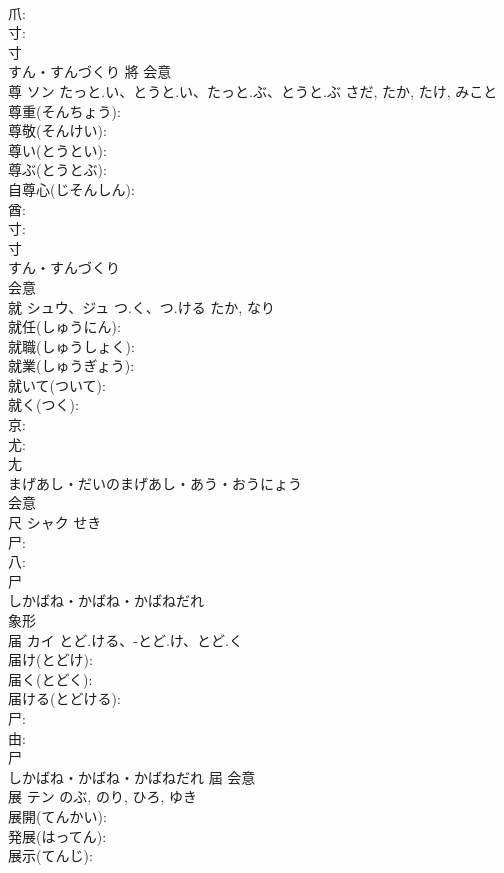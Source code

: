 \documentclass[8pt]{extreport}
\begin{document}
\begin{CJK}{UTF8}{min}
\\	爪: 
\\	寸: 
\\	寸	
\\	すん・すんづくり	將	会意 
\\	尊	ソン	たっと.い、とうと.い、たっと.ぶ、とうと.ぶ	さだ, たか, たけ, みこと	
\\	尊重(そんちょう): 
\\	尊敬(そんけい): 
\\	尊い(とうとい): 
\\	尊ぶ(とうとぶ): 
\\	自尊心(じそんしん): 
\\	酋: 
\\	寸: 
\\	寸	
\\	すん・すんづくり	
\\	会意 
\\	就	シュウ、ジュ	つ.く、つ.ける	たか, なり	
\\	就任(しゅうにん): 
\\	就職(しゅうしょく): 
\\	就業(しゅうぎょう): 
\\	就いて(ついて): 
\\	就く(つく): 
\\	京: 
\\	尤: 
\\	尢	
\\	まげあし・だいのまげあし・あう・おうにょう	
\\	会意 
\\	尺	シャク		せき	
\\	尸: 
\\	八: 
\\	尸	
\\	しかばね・かばね・かばねだれ	
\\	象形 
\\	届	カイ	とど.ける、-とど.け、とど.く		
\\	届け(とどけ): 
\\	届く(とどく): 
\\	届ける(とどける): 
\\	尸: 
\\	由: 
\\	尸	
\\	しかばね・かばね・かばねだれ	屆	会意 
\\	展	テン		のぶ, のり, ひろ, ゆき	
\\	展開(てんかい): 
\\	発展(はってん): 
\\	展示(てんじ): 

\end{CJK}
\end{document}
